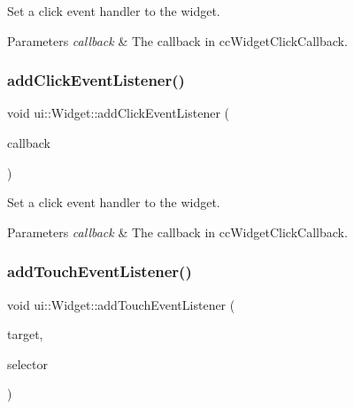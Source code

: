 Set a click event handler to the widget. 
\begin{DoxyParams}{Parameters}
{\em callback} & The callback in {\ttfamily cc\+Widget\+Click\+Callback}. \\
\hline
\end{DoxyParams}
\mbox{\label{classui_1_1Widget_a840938728aeeca3152490620ab1952d1}} 
\subsubsection{\texorpdfstring{add\+Click\+Event\+Listener()}{addClickEventListener()}\hspace{0.1cm}{\footnotesize\ttfamily [2/2]}}
{\footnotesize\ttfamily void ui\+::\+Widget\+::add\+Click\+Event\+Listener (\begin{DoxyParamCaption}\item[{const \hyperlink{classui_1_1Widget_a01110bd071334e41c48ee0bec593db61}{cc\+Widget\+Click\+Callback} \&}]{callback }\end{DoxyParamCaption})}

Set a click event handler to the widget. 
\begin{DoxyParams}{Parameters}
{\em callback} & The callback in {\ttfamily cc\+Widget\+Click\+Callback}. \\
\hline
\end{DoxyParams}
\mbox{\label{classui_1_1Widget_a1a05fc5ea29331d0ae77df9885fc5846}} 
\subsubsection{\texorpdfstring{add\+Touch\+Event\+Listener()}{addTouchEventListener()}\hspace{0.1cm}{\footnotesize\ttfamily [1/4]}}
{\footnotesize\ttfamily void ui\+::\+Widget\+::add\+Touch\+Event\+Listener (\begin{DoxyParamCaption}\item[{\hyperlink{classRef}{Ref} $\ast$}]{target,  }\item[{S\+E\+L\+\_\+\+Touch\+Event}]{selector }\end{DoxyParamCaption})}

